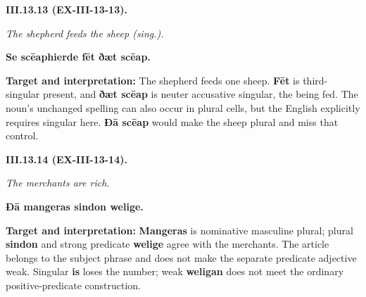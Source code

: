 \par\begin{minipage}{\linewidth}\raggedright
\textbf{III.13.13 (EX-III-13-13).}

\emph{The shepherd feeds the sheep (sing.).}

\textbf{Se scēaphierde fēt ðæt scēap.}

\textbf{Target and interpretation:} The shepherd feeds one sheep. \textbf{Fēt} is third-singular present, and \textbf{ðæt scēap} is neuter accusative singular, the being fed. The noun's unchanged spelling can also occur in plural cells, but the English explicitly requires singular here. \textbf{Ðā scēap} would make the sheep plural and miss that control.

\end{minipage}\par\addvspace{4pt}

\par\begin{minipage}{\linewidth}\raggedright
\textbf{III.13.14 (EX-III-13-14).}

\emph{The merchants are rich.}

\textbf{Ðā mangeras sindon welige.}

\textbf{Target and interpretation:} \textbf{Mangeras} is nominative masculine plural; plural \textbf{sindon} and strong predicate \textbf{welige} agree with the merchants. The article belongs to the subject phrase and does not make the separate predicate adjective weak. Singular \textbf{is} loses the number; weak \textbf{weligan} does not meet the ordinary positive-predicate construction.

\end{minipage}\par\addvspace{4pt}

